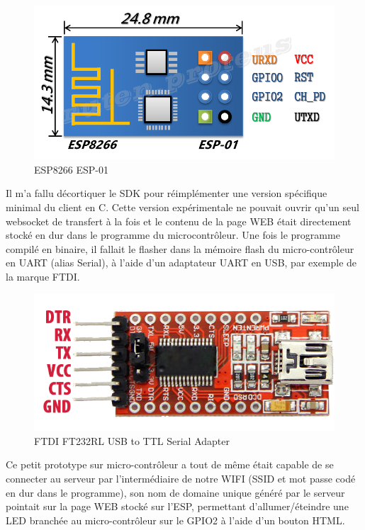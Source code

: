 \begin{figure}[htp]
  \centering
  \includegraphics[width=12cm]{images/esp}
  \caption{ESP8266 ESP-01}
  \label{fig:une-autre-image}
\end{figure}

Il m'a fallu décortiquer le SDK pour réimplémenter une version
spécifique minimal du client en C. Cette version expérimentale ne
pouvait ouvrir qu'un seul websocket de transfert à la fois et le
contenu de la page WEB était directement stocké en dur dans le
programme du microcontrôleur. Une fois le programme compilé en
binaire, il fallait le flasher dans la mémoire flash du
micro-contrôleur en UART (alias Serial), à l'aide d'un adaptateur UART
en USB, par exemple de la marque FTDI.

\begin{figure}[htp]
  \centering
  \includegraphics[width=12cm]{images/ftdi}
  \caption{FTDI FT232RL USB to TTL Serial Adapter}
  \label{fig:une-autre-image}
\end{figure}

Ce petit prototype sur micro-contrôleur a tout de même était capable
de se connecter au serveur par l'intermédiaire de notre WIFI (SSID et
mot passe codé en dur dans le programme), son nom de domaine unique
généré par le serveur pointait sur la page WEB stocké sur l'ESP,
permettant d'allumer/éteindre une LED branchée au micro-contrôleur sur
le GPIO2 à l'aide d'un bouton HTML.

